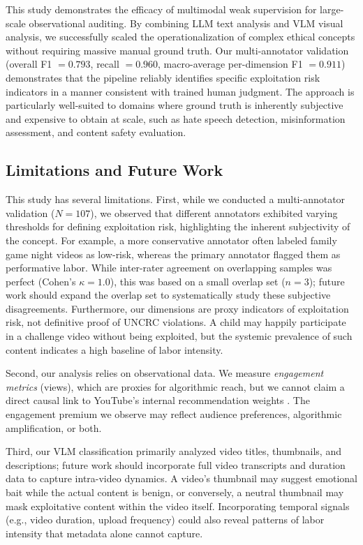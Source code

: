 \documentclass[letterpaper]{article} %
\begin{document}
This study demonstrates the efficacy of multimodal weak supervision for large-scale observational auditing. By combining LLM text analysis and VLM visual analysis, we successfully scaled the operationalization of complex ethical concepts without requiring massive manual ground truth. Our multi-annotator validation (overall F1 $= 0.793$, recall $= 0.960$, macro-average per-dimension F1 $= 0.911$) demonstrates that the pipeline reliably identifies specific exploitation risk indicators in a manner consistent with trained human judgment. The approach is particularly well-suited to domains where ground truth is inherently subjective and expensive to obtain at scale, such as hate speech detection, misinformation assessment, and content safety evaluation.

\subsection{Limitations and Future Work}

This study has several limitations. First, while we conducted a multi-annotator validation ($N=107$), we observed that different annotators exhibited varying thresholds for defining exploitation risk, highlighting the inherent subjectivity of the concept. For example, a more conservative annotator often labeled family game night videos as low-risk, whereas the primary annotator flagged them as performative labor. While inter-rater agreement on overlapping samples was perfect (Cohen's $\kappa=1.0$), this was based on a small overlap set ($n=3$); future work should expand the overlap set to systematically study these subjective disagreements. Furthermore, our dimensions are proxy indicators of exploitation risk, not definitive proof of UNCRC violations. A child may happily participate in a challenge video without being exploited, but the systemic prevalence of such content indicates a high baseline of labor intensity.

Second, our analysis relies on observational data. We measure \emph{engagement metrics} (views), which are proxies for algorithmic reach, but we cannot claim a direct causal link to YouTube's internal recommendation weights \citep{rieder2018ranking}. The engagement premium we observe may reflect audience preferences, algorithmic amplification, or both.

Third, our VLM classification primarily analyzed video titles, thumbnails, and descriptions; future work should incorporate full video transcripts and duration data to capture intra-video dynamics. A video's thumbnail may suggest emotional bait while the actual content is benign, or conversely, a neutral thumbnail may mask exploitative content within the video itself. Incorporating temporal signals (e.g., video duration, upload frequency) could also reveal patterns of labor intensity that metadata alone cannot capture.
\end{document}
